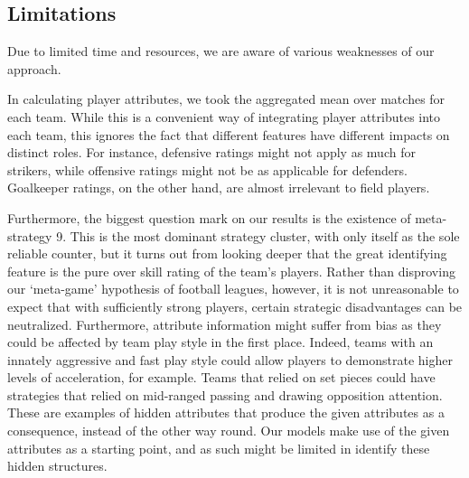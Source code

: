 \documentclass{article}
\begin{document}
\subsection{Limitations}
Due to limited time and resources, we are aware of various weaknesses of our approach. 
\par In calculating player attributes, we took the aggregated mean over matches for each team. While this is a convenient way of integrating player attributes into each team, this ignores the fact that different features have different impacts on distinct roles. For instance, defensive ratings might not apply as much for strikers, while offensive ratings might not be as applicable for defenders. Goalkeeper ratings, on the other hand, are almost irrelevant to field players. 
\par Furthermore, the biggest question mark on our results is the existence of meta-strategy 9. This is the most dominant strategy cluster, with only itself as the sole reliable counter, but it turns out from looking deeper that the great identifying feature is the pure over skill rating of the team's players. Rather than disproving our `meta-game' hypothesis of football leagues, however, it is not unreasonable to expect that with sufficiently strong players, certain strategic disadvantages can be neutralized. Furthermore, attribute information might suffer from bias as they could be affected by team play style in the first place. Indeed, teams with an innately aggressive and fast play style could allow players to demonstrate higher levels of acceleration, for example. Teams that relied on set pieces could have strategies that relied on mid-ranged passing and drawing opposition attention. These are examples of hidden attributes that produce the given attributes as a consequence, instead of the other way round. Our models make use of the given attributes as a starting point, and as such might be limited in identify these hidden structures. 
\end{document}
